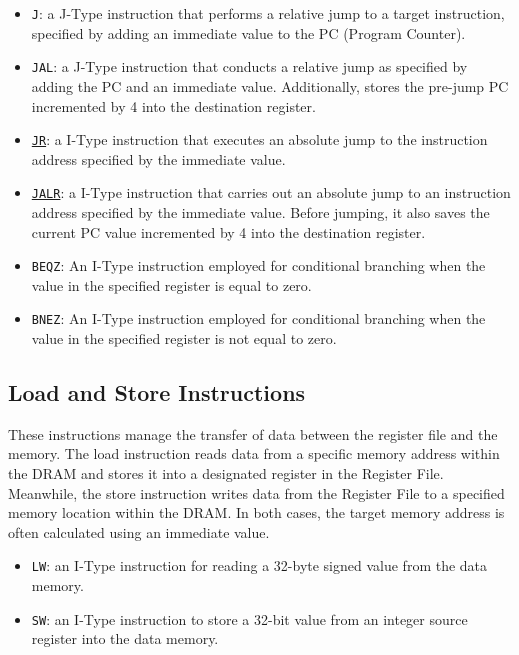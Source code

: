 \begin{itemize}%
	\item \texttt{J}: a J-Type instruction that performs a relative jump to a target instruction, specified by adding an immediate value to the PC (Program Counter).
	\item \texttt{JAL}: a J-Type instruction that conducts a relative jump as specified by adding the PC and an immediate value. Additionally, stores the pre-jump PC incremented by 4 into the destination register.
	\item \underline{\texttt{JR}}: a I-Type instruction that executes an absolute jump to the instruction address specified by the immediate value.
	\item \underline{\texttt{JALR}}: a I-Type instruction that carries out an absolute jump to an instruction address specified by the immediate value. Before jumping, it also saves the current PC value incremented by 4 into the destination register.
	\item \texttt{BEQZ}: An I-Type instruction employed for conditional branching when the value in the specified register is equal to zero.
	\item \texttt{BNEZ}: An I-Type instruction employed for conditional branching when the value in the specified register is not equal to zero.
\end{itemize}

\subsection{Load and Store Instructions}
These instructions manage the transfer of data between the register file and the memory. The load instruction reads data from a specific memory address within the DRAM and stores it into a designated register in the Register File. Meanwhile, the store instruction writes data from the Register File to a specified memory location within the DRAM. In both cases, the target memory address is often calculated using an immediate value.

\begin{itemize}%
	\item \texttt{LW}: an I-Type instruction for reading a 32-byte signed value from the data memory.
	\item \texttt{SW}: an I-Type instruction to store a 32-bit value from an integer source register into the data memory.
\end{itemize}

